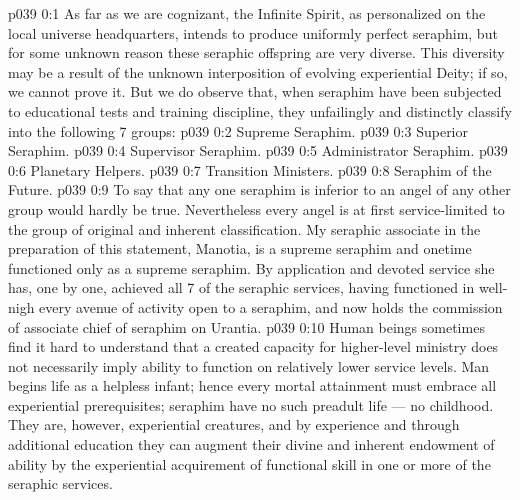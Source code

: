 \author{Melchizedek}
\vs p039 0:1 As far as we are cognizant, the Infinite Spirit, as personalized on the local universe headquarters, intends to produce uniformly perfect seraphim, but for some unknown reason these seraphic offspring are very diverse. This diversity may be a result of the unknown interposition of evolving experiential Deity; if so, we cannot prove it. But we do observe that, when seraphim have been subjected to educational tests and training discipline, they unfailingly and distinctly classify into the following 7 groups:
\vs p039 0:2 \bibnobreakspace Supreme Seraphim.
\vs p039 0:3 \bibnobreakspace Superior Seraphim.
\vs p039 0:4 \bibnobreakspace Supervisor Seraphim.
\vs p039 0:5 \bibnobreakspace Administrator Seraphim.
\vs p039 0:6 \bibnobreakspace Planetary Helpers.
\vs p039 0:7 \bibnobreakspace Transition Ministers.
\vs p039 0:8 \bibnobreakspace Seraphim of the Future.
\vs p039 0:9 \pc To say that any one seraphim is inferior to an angel of any other group would hardly be true. Nevertheless every angel is at first service\hyp{}limited to the group of original and inherent classification. My seraphic associate in the preparation of this statement, Manotia, is a supreme seraphim and onetime functioned only as a supreme seraphim. By application and devoted service she has, one by one, achieved all 7 of the seraphic services, having functioned in well\hyp{}nigh every avenue of activity open to a seraphim, and now holds the commission of associate chief of seraphim on Urantia.
\vs p039 0:10 Human beings sometimes find it hard to understand that a created capacity for higher\hyp{}level ministry does not necessarily imply ability to function on relatively lower service levels. Man begins life as a helpless infant; hence every mortal attainment must embrace all experiential prerequisites; seraphim have no such preadult life --- no childhood. They are, however, experiential creatures, and by experience and through additional education they can augment their divine and inherent endowment of ability by the experiential acquirement of functional skill in one or more of the seraphic services.
